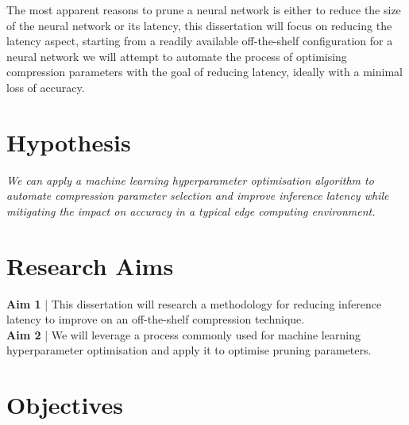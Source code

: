 \documentclass[../Dissertation.tex]{subfiles}
\begin{document}
The most apparent reasons to prune a neural network is either to reduce the size of the neural network or its latency, this dissertation will focus on reducing the latency aspect, starting from a readily available off-the-shelf configuration for a neural network we will attempt to automate the process of optimising compression parameters with the goal of reducing latency, ideally with a minimal loss of accuracy.

\section{Hypothesis}
\emph{We can apply a machine learning hyperparameter optimisation algorithm to automate compression parameter selection and improve inference latency while mitigating the impact on accuracy in a typical edge computing environment.}

\section{Research Aims}

\textbf{Aim 1}\label{Aim1} | This dissertation will research a methodology for reducing inference latency to improve on an off-the-shelf compression technique.\\
\noindent\textbf{Aim 2}\label{Aim2} | We will leverage a process commonly used for machine learning hyperparameter optimisation and apply it to optimise pruning parameters. 

\section{Objectives}
\end{document}
